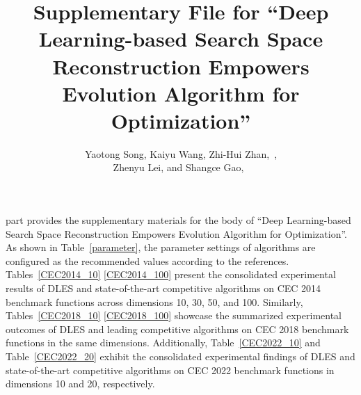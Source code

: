 \documentclass[journal, onecolumn]{IEEEtran}
\begin{document}
\title{Supplementary File for ``Deep Learning-based Search Space Reconstruction Empowers Evolution Algorithm for Optimization''}
\author{
	Yaotong Song,  Kaiyu Wang, Zhi-Hui Zhan,~, \\
	Zhenyu Lei, and Shangce Gao,~  
}
\maketitle
\IEEEpeerreviewmaketitle
{} part provides the supplementary materials for the body of “Deep Learning-based Search Space Reconstruction Empowers Evolution Algorithm for Optimization”. As shown in Table~\ref{parameter}, the parameter settings of algorithms are configured as the recommended values according to the references. Tables~\ref{CEC2014_10} \textemdash \ref{CEC2014_100} present the consolidated experimental results of DLES and state-of-the-art competitive algorithms on CEC 2014 benchmark functions across dimensions 10, 30, 50, and 100. Similarly, Tables~\ref{CEC2018_10} \textemdash \ref{CEC2018_100} showcase the summarized experimental outcomes of DLES and leading competitive algorithms on CEC 2018 benchmark functions in the same dimensions. Additionally, Table~\ref{CEC2022_10} and Table~\ref{CEC2022_20} exhibit the consolidated experimental findings of DLES and state-of-the-art competitive algorithms on CEC 2022 benchmark functions in dimensions 10 and 20, respectively.
\end{document}
